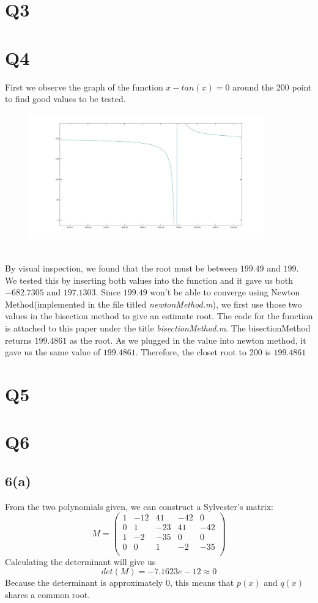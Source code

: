\documentclass{article}
\begin{document}
\section{Q3}
\section{Q4}
First we observe the graph of the function $x - tan(x) = 0$ around the 200 point to find good values to be tested. 
\begin{figure}[h]
\includegraphics[width=4in]{p4.jpg}
\end{figure}\\
By visual inspection, we found that the root must be between $199.49$ and $199$. We tested this by inserting both values into the function and it gave us both $-682.7305$ and $197.1303$. Since $199.49$ won't be able to converge using Newton Method(implemented in the file titled \textit{newtonMethod.m}), we first use those two values in the bisection method to give an estimate root. The code for the function is attached to this paper under the title \textit{bisectionMethod.m}. The bisectionMethod returns $199.4861$ as the root. As we plugged in the value into newton method, it gave us the same value of $199.4861$. Therefore, the closet root to 200 is $199.4861$
\section{Q5}
\section{Q6}
\subsection{6(a)}
From the two polynomials given, we can construct a Sylvester's matrix:
\begin{equation*}
M = 
\begin{pmatrix}
1 &-12 &41 &-42& 0\\
0 &1   &-23 & 41 & -42\\
1& -2& -35& 0& 0\\
0& 0& 1& -2& -35\\ 
\end{pmatrix}
\end{equation*}
Calculating the determinant will give us
\begin{equation*}
det(M) = -7.1623e-12 \approx 0
\end{equation*}
Because the determinant is approximately 0, this means that $p(x)$ and $q(x)$ shares a common root.
\end{document}
